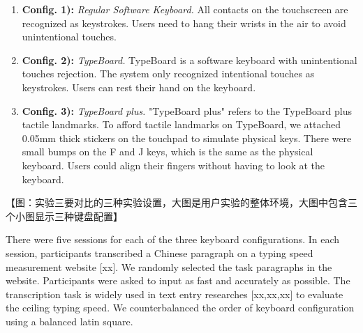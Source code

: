 \begin{enumerate}
	\item{\textbf{Config. 1):} \emph{Regular Software Keyboard.} All contacts on the touchscreen are recognized as keystrokes. Users need to hang their wrists in the air to avoid unintentional touches.}
	\item{\textbf{Config. 2):} \emph{TypeBoard.} TypeBoard is a software keyboard with unintentional touches rejection. The system only recognized intentional touches as keystrokes. Users can rest their hand on the keyboard.}
	\item{\textbf{Config. 3):} \emph{TypeBoard plus.} "TypeBoard plus" refers to the TypeBoard plus tactile landmarks. To afford tactile landmarks on TypeBoard, we attached 0.05mm thick stickers on the touchpad to simulate physical keys. There were small bumps on the F and J keys, which is the same as the physical keyboard. Users could align their fingers without having to look at the keyboard.}
\end{enumerate}

【图：实验三要对比的三种实验设置，大图是用户实验的整体环境，大图中包含三个小图显示三种键盘配置】


There were five sessions for each of the three keyboard configurations. In each session, participants transcribed a Chinese paragraph on a typing speed measurement website [xx]. We randomly selected the task paragraphs in the website. Participants were asked to input as fast and accurately as possible. The transcription task is widely used in text entry researches [xx,xx,xx] to evaluate the ceiling typing speed.  We counterbalanced the order of keyboard configuration using a balanced latin square.

